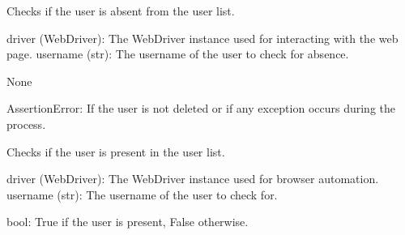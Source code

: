 \documentclass[letterpaper,10pt,english]{sphinxmanual}
\begin{document}
\begin{fulllineitems}
\label{\detokenize{utils:utils.user_management.check_user_absence}}
\pysigstartsignatures
{}
\pysigstopsignatures
\sphinxAtStartPar
Checks if the user is absent from the user list.
\begin{description}
\sphinxAtStartPar
driver (WebDriver): The WebDriver instance used for interacting with the web page.
username (str): The username of the user to check for absence.

\sphinxAtStartPar
None

\sphinxAtStartPar
AssertionError: If the user is not deleted or if any exception occurs during the process.

\end{description}

\end{fulllineitems}


\begin{fulllineitems}
\label{\detokenize{utils:utils.user_management.check_user_presence}}
\pysigstartsignatures
{}
\pysigstopsignatures
\sphinxAtStartPar
Checks if the user is present in the user list.
\begin{description}
\sphinxAtStartPar
driver (WebDriver): The WebDriver instance used for browser automation.
username (str): The username of the user to check for.

\sphinxAtStartPar
bool: True if the user is present, False otherwise.

\end{description}

\end{fulllineitems}

\end{document}
